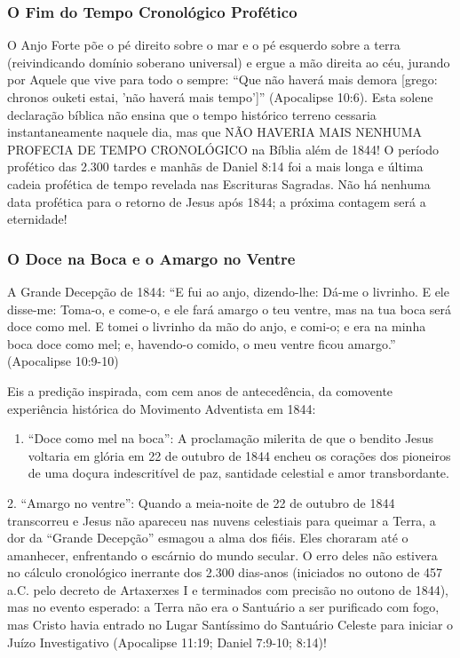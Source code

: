 \documentclass[11pt,a4paper,openany]{book}
\begin{document}
\subsubsection*{O Fim do Tempo Cronológico Profético}
O Anjo Forte põe o pé direito sobre o mar e o pé esquerdo sobre a terra (reivindicando domínio soberano universal) e ergue a mão direita ao céu, jurando por Aquele que vive para todo o sempre: ``Que não haverá mais demora [grego: chronos ouketi estai, 'não haverá mais tempo']'' (Apocalipse 10:6).
Esta solene declaração bíblica não ensina que o tempo histórico terreno cessaria instantaneamente naquele dia, mas que NÃO HAVERIA MAIS NENHUMA PROFECIA DE TEMPO CRONOLÓGICO na Bíblia além de 1844! O período profético das 2.300 tardes e manhãs de Daniel 8:14 foi a mais longa e última cadeia profética de tempo revelada nas Escrituras Sagradas. Não há nenhuma data profética para o retorno de Jesus após 1844; a próxima contagem será a eternidade!


\subsubsection*{O Doce na Boca e o Amargo no Ventre}
A Grande Decepção de 1844:
``E fui ao anjo, dizendo-lhe: Dá-me o livrinho. E ele disse-me: Toma-o, e come-o, e ele fará amargo o teu ventre, mas na tua boca será doce como mel. E tomei o livrinho da mão do anjo, e comi-o; e era na minha boca doce como mel; e, havendo-o comido, o meu ventre ficou amargo.'' (Apocalipse 10:9-10)

Eis a predição inspirada, com cem anos de antecedência, da comovente experiência histórica do Movimento Adventista em 1844:
\begin{enumerate}
  \item ``Doce como mel na boca'': A proclamação milerita de que o bendito Jesus voltaria em glória em 22 de outubro de 1844 encheu os corações dos pioneiros de uma doçura indescritível de paz, santidade celestial e amor transbordante.
\end{enumerate}

2. ``Amargo no ventre'': Quando a meia-noite de 22 de outubro de 1844 transcorreu e Jesus não apareceu nas nuvens celestiais para queimar a Terra, a dor da ``Grande Decepção'' esmagou a alma dos fiéis. Eles choraram até o amanhecer, enfrentando o escárnio do mundo secular. O erro deles não estivera no cálculo cronológico inerrante dos 2.300 dias-anos (iniciados no outono de 457 a.C. pelo decreto de Artaxerxes I e terminados com precisão no outono de 1844), mas no evento esperado: a Terra não era o Santuário a ser purificado com fogo, mas Cristo havia entrado no Lugar Santíssimo do Santuário Celeste para iniciar o Juízo Investigativo (Apocalipse 11:19; Daniel 7:9-10; 8:14)!
\end{document}
